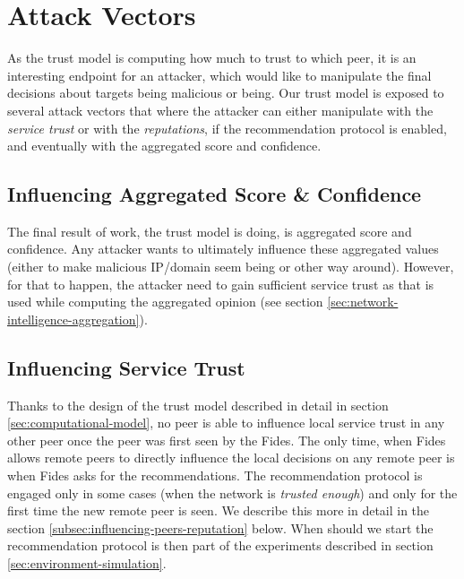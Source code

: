 \section{Attack Vectors}
\label{sec:attack-vectors}
As the trust model is computing how much to trust to which peer, it is an interesting endpoint for an attacker, which would like to manipulate the final decisions about targets being malicious or being.
Our trust model is exposed to several attack vectors that where the attacker can either manipulate with the \textit{service trust} or with the \textit{reputations}, if the recommendation protocol is enabled, and eventually with the aggregated score and confidence.

\subsection{Influencing Aggregated Score \& Confidence}
\label{subsec:influencing-aggregated-score-confidence}
The final result of work, the trust model is doing, is aggregated score and confidence.
Any attacker wants to ultimately influence these aggregated values (either to make malicious IP/domain seem being or other way around).
However, for that to happen, the attacker need to gain sufficient service trust as that is used while computing the aggregated opinion (see section \ref{sec:network-intelligence-aggregation}).

\subsection{Influencing Service Trust}
\label{subsec:influencing-service-trust}
Thanks to the design of the trust model described in detail in section \ref{sec:computational-model}, no peer is able to influence local service trust in any other peer once the peer was first seen by the Fides.
The only time, when Fides allows remote peers to directly influence the local decisions on any remote peer is when Fides asks for the recommendations. 
The recommendation protocol is engaged only in some cases (when the network is \textit{trusted enough}) and only for the first time the new remote peer is seen. We describe this more in detail in the section \ref{subsec:influencing-peers-reputation} below.
When should we start the recommendation protocol is then part of the experiments described in section \ref{sec:environment-simulation}.

